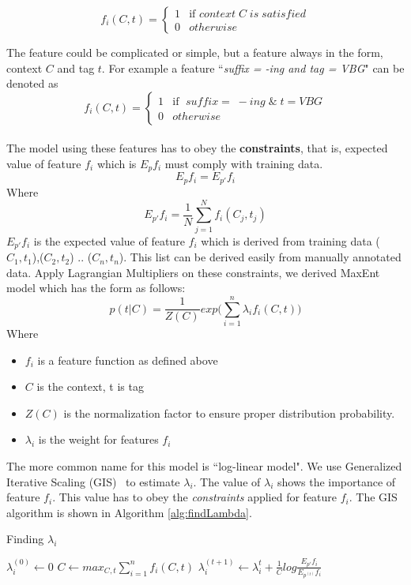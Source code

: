 \[
 f_i(C,t) =
  \begin{cases}
   1 & \text{if } context\; C\;is\; satisfied   \\
   0  & otherwise
  \end{cases}
\]

The feature could be complicated or simple, but a feature always in the form, context $C$ and tag $t$. For example a feature ``\textit{suffix = -ing and tag =  VBG}" can be denoted as 
\[
 f_i(C,t) =
  \begin{cases}
   1 & \text{if } \;suffix = \; -ing \; \& \; t = VBG   \\
   0  & otherwise
  \end{cases}
\]\\
The model using these features has to obey the \textbf{constraints}, that is, expected value of feature $f_i$ which is $E_p f_i$ must comply with training data. 
$$E_p f_i = E_{p'}f_i$$
Where 
$$E_{p'}f_i = \frac{1}{N} \sum_{j=1}^{N}f_i(C_j,t_j)$$
$E_{p'}f_i$ is the expected value of feature $f_i$ which is derived from training data ($C_1,t_1$),($C_2,t_2$) .. ($C_n,t_n$). This list can be derived easily from manually annotated data. Apply Lagrangian Multipliers on these constraints, we derived MaxEnt model which has the form as follows:
\begin{equation}
\label{equa:loglinearMaxEnt}
p(t|C) = \frac{1}{Z(C)} exp\Big( \sum_{i=1}^{n}\lambda_if_i(C,t)    \Big)
\end{equation}
Where 
\begin{itemize}
\item $f_i$ is a feature function as defined above 
\item $C$ is the context, t is tag 
\item $Z(C)$ is the normalization factor to ensure proper distribution probability. 
\item $\lambda_i$ is the weight for features $f_i$
\end{itemize}
The more common name for this model is ``log-linear model". We use Generalized Iterative Scaling (GIS)~\cite{Darroch1972} to estimate $\lambda_i$. The value of  $\lambda_i$ shows the importance of feature $f_i$. This value has to obey the \emph{constraints} applied for feature $f_i$. The GIS algorithm is shown in Algorithm \ref{alg:findLambda}.
\begin{algorithm}
\caption{Finding $\lambda_i$}
\label{alg:findLambda}
\begin{algorithmic} 
\STATE $\lambda_i^{(0)} \leftarrow 0$
\STATE $C \leftarrow max_{C,t} \sum_{i=1}^{n} f_i(C,t)$
\STATE $\lambda_i^{(t+1)} \leftarrow \lambda_i^t + \frac{1}{C}log\frac{E_{p'}f_i}{E_{p^{(t)}}f_i}$
\ENDWHILE
\end{algorithmic}
\end{algorithm}

